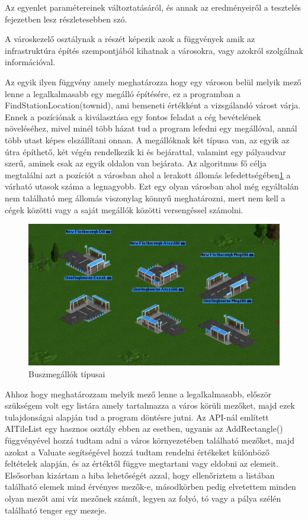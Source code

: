 Az egyenlet paramétereinek változtatásáról, és annak az eredményeiről a tesztelés fejezetben lesz részletesebben szó.


A városkezelő osztálynak a részét képezik azok a függvények amik az infrastruktúra építés szempontjából kihatnak a városokra, vagy azokról szolgálnak információval.

Az egyik ilyen függvény amely meghatározza hogy egy városon belül melyik mező lenne a legalkalmasabb egy megálló építésére, ez a programban a FindStationLocation(townid), ami bemeneti értékként a vizsgálandó várost várja. Ennek a pozíciónak a kiválasztása egy fontos feladat a cég bevételének növeléséhez, mivel minél több házat tud a program lefedni egy megállóval, annál több utast képes elszállítani onnan. A megállóknak két típusa van, az egyik az útra építhető, két végén rendelkezik ki és bejárattal, valamint egy pályaudvar szerű, aminek csak az egyik oldalon van bejárata. Az algoritmus fő célja megtalálni azt a pozíciót a városban ahol a lerakott állomás lefedettségében\ref{fig:megallok} a várható utasok száma a legnagyobb. Ezt egy olyan városban ahol még egyáltalán nem található meg állomás viszonylag könnyű meghatározni, mert nem kell a cégek közötti vagy a saját megállók közötti versengéssel számolni.

\begin{figure}
	\centering
	\includegraphics[scale=0.4]{images/megallok.png}
	\caption{Buszmegállók típusai}
	\label{fig:megallok}
\end{figure}

Ahhoz hogy meghatározzam melyik mező lenne a legalkalmasabb, először szükségem volt egy listára amely tartalmazza a város körüli mezőket, majd ezek tulajdonságai alapján tud a program döntésre jutni. Az API-nál említett AITileList egy hasznos osztály ebben az esetben, ugyanis az AddRectangle() függvényével hozzá tudtam adni a város környezetében található mezőket, majd azokat a Valuate segítségével hozzá tudtam rendelni értékeket különböző feltételek alapján, és az értéktől függve megtartani vagy eldobni az elemeit. Elsősorban kizártam a hiba lehetőségét azzal, hogy ellenőriztem a listában található elemek mind érvényes mezők-e, másodkörben pedig elvetettem minden olyan mezőt ami víz mezőnek számít, legyen az folyó, tó vagy a pálya szélén található tenger egy mezeje.

